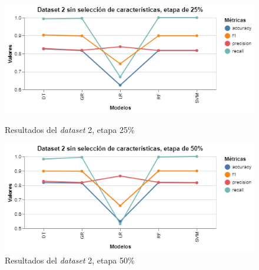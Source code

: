 \begin{figure}[htbp]
    \centering
    \begin{minipage}[t]{0.50\textwidth}
        \centering
        \includegraphics[width = \textwidth]{Graphics/dataset_2_25.png}
        \caption{Resultados del \textit{dataset} 2, etapa 25\%}
        \label{dataset2_25}
    \end{minipage}\hfill
    \begin{minipage}[t]{0.50\textwidth}
        \centering
        \includegraphics[width = \textwidth]{Graphics/dataset_2_50.png}
        \caption{Resultados del \textit{dataset} 2, etapa 50\%}
        \label{dataset2_50}
    \end{minipage}
\end{figure}

